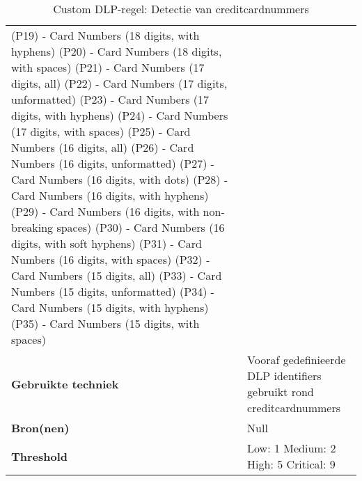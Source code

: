 \begin{table}[h]
\begin{tabular}{p{4cm} p{10cm}}
        (P19) - Card Numbers (18 digits, with hyphens) \newline
        (P20) - Card Numbers (18 digits, with spaces) \newline
        (P21) - Card Numbers (17 digits, all) \newline
        (P22) - Card Numbers (17 digits, unformatted) \newline
        (P23) - Card Numbers (17 digits, with hyphens) \newline
        (P24) - Card Numbers (17 digits, with spaces) \newline
        (P25) - Card Numbers (16 digits, all) \newline
        (P26) - Card Numbers (16 digits, unformatted) \newline
        (P27) - Card Numbers (16 digits, with dots) \newline
        (P28) - Card Numbers (16 digits, with hyphens) \newline
        (P29) - Card Numbers (16 digits, with non-breaking spaces) \newline
        (P30) - Card Numbers (16 digits, with soft hyphens) \newline
        (P31) - Card Numbers (16 digits, with spaces) \newline
        (P32) - Card Numbers (15 digits, all) \newline
        (P33) - Card Numbers (15 digits, unformatted) \newline
        (P34) - Card Numbers (15 digits, with hyphens) \newline
        (P35) - Card Numbers (15 digits, with spaces) \\
        \textbf{Gebruikte techniek} & Vooraf gedefinieerde DLP identifiers gebruikt rond creditcardnummers \\
        \textbf{Bron(nen)} & Null \\
        \textbf{Threshold} & Low: 1 \quad Medium: 2 \quad High: 5 \quad Critical: 9 \\
        \bottomrule
    \end{tabular}
    \caption{Custom DLP-regel: Detectie van creditcardnummers}
    \label{tab:custom-eu-card}
\end{table}

